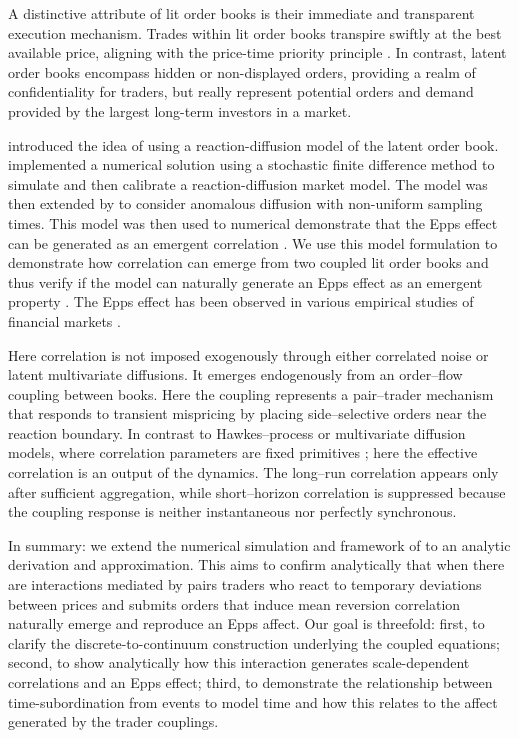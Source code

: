 \documentclass[5p,final]{elsarticle}
\begin{document}
A distinctive attribute of lit order books is their immediate and transparent execution mechanism. Trades within lit order books transpire swiftly at the best available price, aligning with the price-time priority principle \citep{ohara1995}. In contrast, latent order books  \citep{toth2011} encompass hidden or non-displayed orders, providing a realm of confidentiality for traders, but really represent potential orders and demand provided by the largest long-term investors in a market. 

\citet{donier2015}introduced the idea of using a reaction-diffusion model of the latent order book. \citet{Gant2022b} implemented a numerical solution using a stochastic finite difference method \citep{angstmann2019advection,angstmann2016} to simulate and then calibrate a reaction-diffusion market model. The model was then extended by \citet{DianaGebbie2025} to consider anomalous diffusion with non-uniform sampling times. This model was then used to numerical demonstrate that the Epps effect can be generated as an emergent correlation \cite{BauerDianaGebbie2024}. We use this model formulation to demonstrate how correlation can emerge from two coupled lit order books and thus verify if the model can naturally generate an Epps effect as an emergent property \citep{epps1979}. The Epps effect has been observed in various empirical studies of financial markets \citep{mastromatteo2011}.

Here correlation is not imposed exogenously through either correlated noise or latent multivariate diffusions. It emerges endogenously from an order--flow coupling between books. Here the coupling represents a pair--trader mechanism that responds to transient mispricing by placing side--selective orders near the reaction boundary. In contrast to Hawkes--process or multivariate diffusion models, where correlation parameters are fixed primitives \citep{bacry2015,gatheral2012}; here the effective correlation is an output of the dynamics. The long--run correlation appears only after sufficient aggregation, while short--horizon correlation is suppressed because the coupling response is neither instantaneous nor perfectly synchronous. 

In summary: we extend the numerical simulation and framework of  \citet{BauerDianaGebbie2024} to an analytic derivation and approximation. This aims to confirm analytically that when there are interactions mediated by pairs traders who react to temporary deviations between prices and submits orders that induce mean reversion correlation naturally emerge and reproduce an Epps affect. Our goal is threefold: first, to clarify the discrete-to-continuum construction underlying the coupled equations; second, to show analytically how this interaction generates scale-dependent correlations and an Epps effect; third, to demonstrate the relationship between time-subordination from events to model time and how this relates to the affect generated by the trader couplings. 
\end{document}
